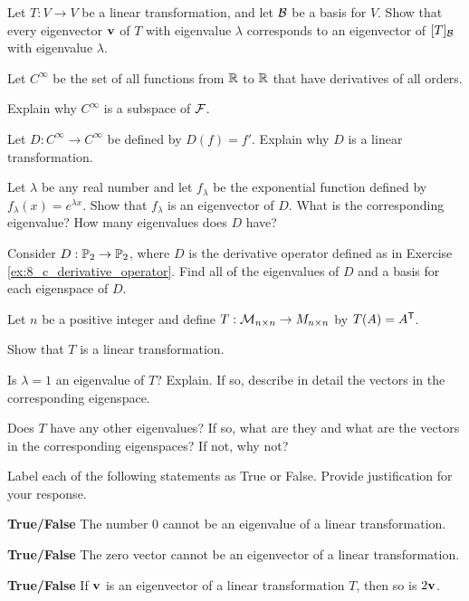 \item \label{ex:8_c_evals_linear_Transformations}  Let $T: V \to V$ be a linear transformation, and let $\mathcal{B}$ be a basis for $V$. Show that every eigenvector $\mathbf{v}$ of $T$ with eigenvalue $\lambda$ corresponds to an eigenvector of $[T]_{\mathcal{B}}$ with eigenvalue $\lambda$. 

 
\item \label{ex:8_c_derivative_operator} Let $C^{\infty}$ be the set of all functions from $\mathbb{R}$ to $\mathbb{R}$ that have derivatives of all orders. 
	\ba
	\item Explain why $C^{\infty}$ is a subspace of $\mathcal{F}$. 
	\item Let $D : C^{\infty} \to C^{\infty}$ be defined by $D(f) = f'$. Explain why $D$ is a linear transformation.
	\item Let $\lambda$ be any real number and let $f_{\lambda}$ be the exponential function defined by $f_{\lambda}(x) = e^{\lambda x}$. Show that $f_{\lambda}$ is an eigenvector of $D$. What is the corresponding eigenvalue? How many eigenvalues does $D$ have? 
	\ea

\item Consider $D : \mathbb{P}_2 \to \mathbb{P}_2$, where $D$ is the derivative operator defined as in Exercise  \ref{ex:8_c_derivative_operator}.  Find all of the eigenvalues of $D$ and a basis for each eigenspace of $D$.
	
\item Let $n$ be a positive integer and define $T : \mathcal{M}_{n \times n} \to M_{n \times n}$ by $T(A) = A^{\mathsf{T}}$.
	\ba
	\item Show that $T$ is a linear transformation.
	\item Is $\lambda = 1$ an eigenvalue of $T$? Explain. If so, describe in detail the vectors in the corresponding eigenspace.
	\item Does $T$ have any other eigenvalues? If so, what are they and what are the vectors in the corresponding eigenspaces? If not, why not?
	\ea
		 
 \item Label each of the following statements as True or False. Provide justification for your response.
 \ba
\item \textbf{True/False} The number 0 cannot be an eigenvalue of a linear transformation.

\item \textbf{True/False} The zero vector cannot be an eigenvector of a linear transformation.

\item \textbf{True/False} If $\mathbf{v}$ is an eigenvector of a linear transformation $T$, then so is $2\mathbf{v}$.

